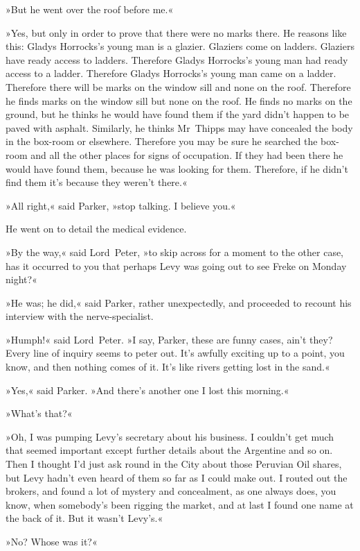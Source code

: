 »But he went over the roof before me.«

»Yes, but only in order to prove that there were no marks there. He reasons like this: Gladys Horrocks's young man is a glazier. Glaziers come on ladders. Glaziers have ready access to ladders. Therefore Gladys Horrocks's young man had ready access to a ladder. Therefore Gladys Horrocks's young man came on a ladder. Therefore there will be marks on the window sill and none on the roof. Therefore he finds marks on the window sill but none on the roof. He finds no marks on the ground, but he thinks he would have found them if the yard didn't happen to be paved with asphalt. Similarly, he thinks Mr~Thipps may have concealed the body in the box-room or elsewhere. Therefore you may be sure he searched the box-room and all the other places for signs of occupation. If they had been there he would have found them, because he was looking for them. Therefore, if he didn't find them it's because they weren't there.«

»All right,« said Parker, »stop talking. I believe you.«

He went on to detail the medical evidence.

»By the way,« said Lord~Peter, »to skip across for a moment to the other case, has it occurred to you that perhaps Levy was going out to see Freke on Monday night?«

»He was; he did,« said Parker, rather unexpectedly, and proceeded to recount his interview with the nerve-specialist.

»Humph!« said Lord~Peter. »I say, Parker, these are funny cases, ain't they? Every line of inquiry seems to peter out. It's awfully exciting up to a point, you know, and then nothing comes of it. It's like rivers getting lost in the sand.«

»Yes,« said Parker. »And there's another one I lost this morning.«

»What's that?«

»Oh, I was pumping Levy's secretary about his business. I couldn't get much that seemed important except further details about the Argentine and so on. Then I thought I'd just ask round in the City about those Peruvian Oil shares, but Levy hadn't even heard of them so far as I could make out. I routed out the brokers, and found a lot of mystery and concealment, as one always does, you know, when somebody's been rigging the market, and at last I found one name at the back of it. But it wasn't Levy's.«

»No? Whose was it?«

